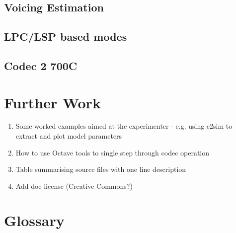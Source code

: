 \documentclass{article}
\begin{document}
\subsection{Voicing Estimation}

\subsection{LPC/LSP based modes}

\subsection{Codec 2 700C}

\section{Further Work}

\begin{enumerate}
\item Some worked examples aimed at the experimenter - e.g. using c2sim to extract and plot model parameters
\item How to use Octave tools to single step through codec operation
\item Table summarising source files with one line description
\item Add doc license (Creative Commons?)
\end{enumerate}

\section{Glossary}
\label{sect:glossary}
\end{document}
